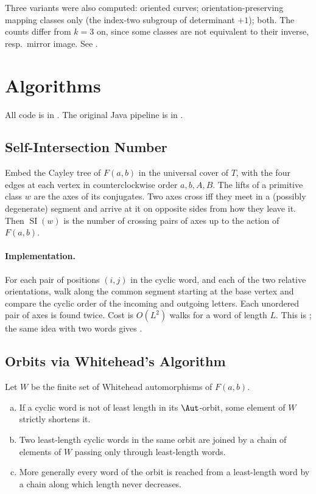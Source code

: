 \documentclass[10pt]{article}
\begin{document}
\begin{rmk}
	Three variants were also computed: oriented curves; orientation-preserving mapping classes only (the index-two subgroup of determinant $+1$); both.
	The counts differ from $k = 3$ on, since some classes are not equivalent to their inverse, resp.\ mirror image.
	See .
\end{rmk}

\section{Algorithms}

All code is in .
The original Java pipeline is in .

\subsection{Self-Intersection Number}

\begin{prop}
	Embed the Cayley tree of $F(a,b)$ in the universal cover of $T$, with the four edges at each vertex in counterclockwise order $a, b, A, B$.
	The lifts of a primitive class $w$ are the axes of its conjugates.
	Two axes cross iff they meet in a (possibly degenerate) segment and arrive at it on opposite sides from how they leave it.
	Then $\operatorname{SI}(w)$ is the number of crossing pairs of axes up to the action of $F(a,b)$.
\end{prop}

\paragraph*{Implementation.}
For each pair of positions $(i,j)$ in the cyclic word, and each of the two relative orientations, walk along the common segment starting at the base vertex and compare the cyclic order of the incoming and outgoing letters.
Each unordered pair of axes is found twice.
Cost is $O(L^2)$ walks for a word of length $L$.
This is ; the same idea with two words gives .

\subsection{Orbits via Whitehead's Algorithm}

\begin{thm}
	Let $W$ be the finite set of Whitehead automorphisms of $F(a,b)$.
	\begin{enumerate}[(a)]
		\item If a cyclic word is not of least length in its $\Aut$-orbit, some element of $W$ strictly shortens it.
		\item Two least-length cyclic words in the same orbit are joined by a chain of elements of $W$ passing only through least-length words.
		\item More generally every word of the orbit is reached from a least-length word by a chain along which length never decreases.
	\end{enumerate}
\end{thm}
\end{document}
